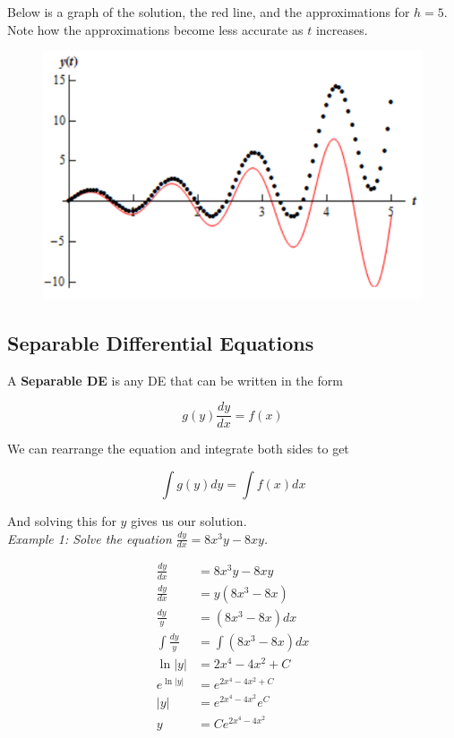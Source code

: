         \noindent Below is a graph of the solution, the red line, and the approximations for $h=5$.
        Note how the approximations become less accurate as $t$ increases.

        \begin{figure} [hbt!]
            \centering
            \includegraphics[scale=0.75]{Resources/Unit6DEs/Euler}
        \end{figure}


    \subsection{Separable Differential Equations}
        A \color{purple} \textbf{Separable DE} \color{black} is any DE that can be written
        in the form

        \begin{equation*}
            g(y)\frac{dy}{dx} = f(x)
        \end{equation*}

        \noindent We can rearrange the equation and integrate both sides to get

        \begin{equation*}
            \int g(y)dy = \int f(x)dx
        \end{equation*}

        \noindent And solving this for $y$ gives us our solution. \\

        \pagebreak
        \noindent \color{blue} \textit{Example 1: Solve the equation $\frac{dy}{dx}=
        8x^3 y-8xy$.} \color{black}

        \begin{align*}
            \frac{dy}{dx}       &= 8x^3 y-8xy \\
            \frac{dy}{dx}       &= y(8x^3-8x) \\
            \frac{dy}{y}        &= (8x^3-8x)dx \\
            \int \frac{dy}{y}   &= \int (8x^3-8x)dx \\
            \ln{|y|}            &= 2x^4-4x^2+C \\
            e^{\ln{|y|}}        &= e^{2x^4-4x^2+C} \\
            |y|                 &= e^{2x^4-4x^2}e^{C} \\
            y                   &= Ce^{2x^4-4x^2}
        \end{align*}

